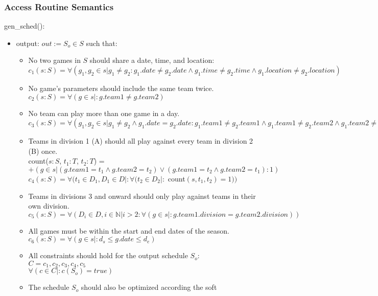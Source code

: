 \documentclass[12pt, titlepage]{article}
\begin{document}
\subsubsection{Access Routine Semantics}

\noindent gen\_sched():
\begin{itemize}
\item output: $out := S_o \in S$ such that:
\begin{itemize}
  \item No two games in $S$ should share a date, time, and location:\\
  $c_1(s:S) = \forall(g_1, g_2 \in s | g_1 \neq g_2 : g_1.date \neq
  g_2.date \land g_1.time \neq g_2.time \land g_1.location \neq g_2.location)$
  \item No game's parameters should include the same team twice.\\
  $c_2(s:S) = \forall (g \in s |: g.team1 \neq g.team2)$
  \item No team can play more than one game in a day.\\
  $c_3(s:S) = \forall (g_1, g_2 \in s |g_1 \neq g_2 \land g_1.date =
  g_2.date : g_1.team1 \neq g_2.team1 \land g_1.team1 \neq g_2.team2 \land
  g_1.team2 \neq g_2.team1 \land g_1.team2 \neq g_2.team2)$
  \item Teams in division 1 (A) should all play against every team in division
  2 (B) once.\\
  count($s:S$, $t_1:T$, $t_2:T$) = $+(g \in s | (g.team1 = t_1 \land
  g.team2 = t_2) \lor (g.team1 = t_2 \land g.team2 = t_1) : 1)$\\
  $c_4(s:S) = \forall (t_1 \in D_1, D_1 \in D |: \forall (t_2 \in D_2 |:$ count$(s, t_1,
  t_2) = 1))$
  \item Teams in divisions 3 and onward should only play against teams in
  their own division.\\
  $c_5(s:S) = \forall (D_i \in D, i \in \mathbb{N} | i > 2 : \forall (g \in s |:
  g.team1.division = g.team2.division))$
  \item All games must be within the start and end dates of the season.\\
  $c_6(s:S) = \forall (g \in s |: d_s \leq g.date \leq d_e)$
  \item All constraints should hold for the output schedule $S_o$:\\
  $C = {c_1, c_2, c_3, c_4, c_5}$\\
  $\forall(c \in C |: c(S_o) = true)$
  \item The schedule $S_o$ should also be optimized according the soft

\end{itemize}
\end{itemize}
\end{document}
